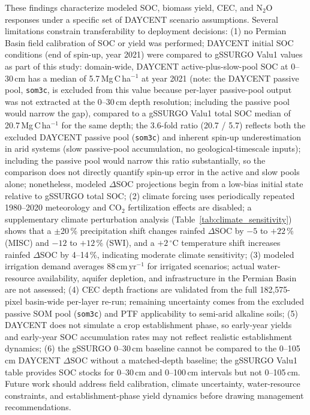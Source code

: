 \documentclass[11pt]{article}
\begin{document}
These findings characterize modeled SOC, biomass yield, CEC, and N$_2$O responses under a specific set of DAYCENT scenario assumptions. Several limitations constrain transferability to deployment decisions: (1) no Permian Basin field calibration of SOC or yield was performed; DAYCENT initial SOC conditions (end of spin-up, year 2021) were compared to gSSURGO Valu1 values as part of this study: domain-wide, DAYCENT active-plus-slow-pool SOC at 0--30\,cm has a median of 5.7\,Mg\,C\,ha$^{-1}$ at year 2021 (note: the DAYCENT passive pool, \texttt{som3c}, is excluded from this value because per-layer passive-pool output was not extracted at the 0--30\,cm depth resolution; including the passive pool would narrow the gap), compared to a gSSURGO Valu1 total SOC median of 20.7\,Mg\,C\,ha$^{-1}$ for the same depth; the 3.6-fold ratio (20.7 / 5.7) reflects both the excluded DAYCENT passive pool (\texttt{som3c}) and inherent spin-up underestimation in arid systems (slow passive-pool accumulation, no geological-timescale inputs); including the passive pool would narrow this ratio substantially, so the comparison does not directly quantify spin-up error in the active and slow pools alone; nonetheless, modeled $\Delta$SOC projections begin from a low-bias initial state relative to gSSURGO total SOC; (2) climate forcing uses periodically repeated 1980--2020 meteorology and CO$_2$ fertilization effects are disabled; a supplementary climate perturbation analysis (Table~\ref{tab:climate_sensitivity}) shows that a $\pm$20\,\% precipitation shift changes rainfed $\Delta$SOC by $-5$ to $+22$\,\% (MISC) and $-12$ to $+12$\,\% (SWI), and a $+2$\,$^\circ$C temperature shift increases rainfed $\Delta$SOC by 4--14\,\%, indicating moderate climate sensitivity; (3) modeled irrigation demand averages 88\,cm\,yr$^{-1}$ for irrigated scenarios; actual water-resource availability, aquifer depletion, and infrastructure in the Permian Basin are not assessed; (4) CEC depth fractions are validated from the full 182,575-pixel basin-wide per-layer re-run; remaining uncertainty comes from the excluded passive SOM pool (\texttt{som3c}) and PTF applicability to semi-arid alkaline soils; (5) DAYCENT does not simulate a crop establishment phase, so early-year yields and early-year SOC accumulation rates may not reflect realistic establishment dynamics; (6) the gSSURGO 0--30\,cm baseline cannot be compared to the 0--105\,cm DAYCENT $\Delta$SOC without a matched-depth baseline; the gSSURGO Valu1 table provides SOC stocks for 0--30\,cm and 0--100\,cm intervals but not 0--105\,cm. Future work should address field calibration, climate uncertainty, water-resource constraints, and establishment-phase yield dynamics before drawing management recommendations.
\end{document}
